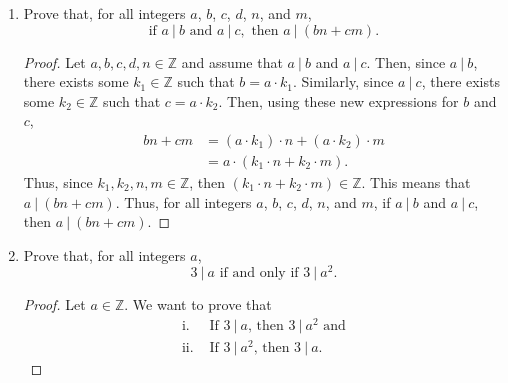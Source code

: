 \documentclass{article}
\begin{document}
\begin{enumerate}
    	\item Prove that, for all integers $a$, $b$, $c$, $d$, $n$, and $m$,
    		\[
    			\text{if } a\ |\ b \text{ and } a\ |\ c, \text{ then } a\ |\ (bn + cm).
    		\]
                \begin{proof}
                    Let $a, b, c, d, n\in\mathbb{Z}$ and assume that $a\ |\ b$ and $a\ |\ c$. Then, since $a\ |\ b$, there exists some $k_1\in\mathbb{Z}$ such that $b = a\cdot k_1$. Similarly, since $a\ |\ c$, there exists some $k_2\in\mathbb{Z}$ such that $c = a\cdot k_2$.
                    \ppar Then, using these new expressions for $b$ and $c$,
                        \begin{align*}
                            bn + cm &= (a\cdot k_1)\cdot n + (a \cdot k_2)\cdot m \\
                            &= a \cdot (k_1\cdot n + k_2 \cdot m).
                        \end{align*}
                    \ppar Thus, since $k_1, k_2, n, m\in\mathbb{Z}$, then $(k_1\cdot n + k_2 \cdot m)\in\mathbb{Z}$. This means that $a\ |\ (bn + cm)$. Thus, for all integers $a$, $b$, $c$, $d$, $n$, and $m$, if $a\ |\ b$ and $a\ |\ c$, then $a\ |\ (bn + cm)$.
                \end{proof}

    	\item Prove that, for all integers $a$,
    		\[
    			3\ |\ a \text{ if and only if } 3\ |\ a^2.
    		\]
                \begin{proof}
                    Let $a\in\mathbb{Z}$. We want to prove that 
                    \begin{align*}
                        \text{i. }   & \text{If $3\ |\ a$, then $3\ |\ a^2$ and}  \\
                        \text{ii. }  & \text{If $3\ |\ a^2$, then $3\ |\ a$.}
                    \end{align*}
                                

\end{proof}
\end{enumerate}
\end{document}
